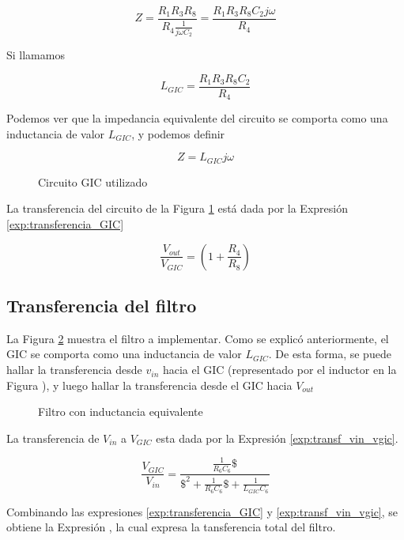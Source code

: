 \[
Z = \frac{R_1R_3R_8}{R_4 \frac{1}{j\omega C_2}} = \frac{R_1R_3R_8C_2j\omega}{R_4}
\]

Si llamamos

\[
L_{GIC} = \frac{R_1R_3R_8C_2}{R_4}
\]

Podemos ver que la impedancia equivalente del circuito se comporta como una inductancia de valor $L_{GIC}$, y podemos definir

\[
Z = L_{GIC}j\omega
\]


\begin{figure}[h]
\centering

\caption{Circuito GIC utilizado}
\label{fig:1_gic_aislado}
\end{figure}

La transferencia del circuito de la Figura \ref{fig:1_gic_aislado} está dada por la Expresión \ref{exp:transferencia_GIC}

\begin{equation}
\frac{V_{out}}{V_{GIC}} = \left(1 + \frac{R_4}{R_8}\right)
\label{exp:transferencia_GIC}
\end{equation}

\subsection{Transferencia del filtro}\label{section_transf_filtro}
La Figura \ref{circuito_induct} muestra el filtro a implementar. Como se explicó anteriormente, el GIC se comporta como una inductancia de valor $L_{GIC}$. De esta forma, se puede hallar la transferencia desde $v_{in}$ hacia el GIC (representado por el inductor en la Figura ), y luego hallar la transferencia desde el GIC hacia $V_{out}$

\begin{figure}[h]
\centering

\caption{Filtro con inductancia equivalente}
\label{circuito_induct}
\end{figure}

La transferencia de $V_{in}$ a $V_{GIC}$ esta dada por la Expresión \ref{exp:transf_vin_vgic}.

\begin{equation}
\frac{V_{GIC}}{V_{in}} = \frac{\frac{1}{R_6C_6}\$}{\$^2 + \frac{1}{R_6C_6}\$ + \frac{1}{L_{GIC}C_6}}
\label{exp:transf_vin_vgic}
\end{equation}

Combinando las expresiones \ref{exp:transferencia_GIC} y \ref{exp:transf_vin_vgic}, se obtiene la Expresión  , la cual expresa la tansferencia total del filtro.

